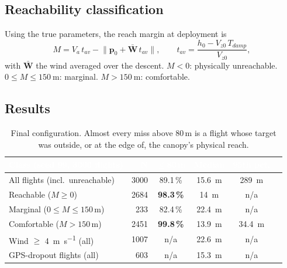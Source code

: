 \documentclass[11pt,a4paper]{article}
\newcommand{\good}[1]{\textcolor{goodgreen}{\textbf{#1}}}
\newcommand{\hdr}[1]{\textcolor{white}{\textbf{#1}}}
\newcommand{\vect}[1]{\mathbf{#1}}
\begin{document}
\subsection{Reachability classification}
Using the true parameters, the reach margin at deployment is
\begin{equation}
  M = V_a\, t_{av} - \bigl\lVert \vect p_0 + \bar{\vect W}\, t_{av} \bigr\rVert,
  \qquad t_{av} = \frac{h_0 - V_{z0}\,T_{damp}}{V_{z0}},
\end{equation}
with $\bar{\vect W}$ the wind averaged over the descent. $M < 0$: physically
unreachable. $0 \le M \le \SI{150}{\meter}$: marginal. $M > \SI{150}{\meter}$:
comfortable.

\subsection{Results}
\begin{table}[H]
\centering
\small
\renewcommand{\arraystretch}{1.2}
\begin{tabular}{lrcccc}
\toprule
\rowcolor{tblhead}\hdr{Class (seed 99, 3000 flights)} & \hdr{N} & \hdr{$\le$80\,m} & \hdr{Median} & \hdr{95th pct.} \\
\midrule
All flights (incl.\ unreachable) & 3000 & 89.1\,\% & \SI{15.6}{\meter} & \SI{289}{\meter} \\
Reachable ($M \ge 0$) & 2684 & \good{98.3\,\%} & \SI{14}{\meter} & n/a \\
\quad Marginal ($0 \le M \le 150$\,m) & 233 & 82.4\,\% & \SI{22.4}{\meter} & n/a \\
\quad Comfortable ($M > 150$\,m) & 2451 & \good{99.8\,\%} & \SI{13.9}{\meter} & \SI{34.4}{\meter} \\
Wind $\ge$ \SI{4}{\meter\per\second} (all) & 1007 & n/a & \SI{22.6}{\meter} & n/a \\
GPS-dropout flights (all) & 603 & n/a & \SI{15.3}{\meter} & n/a \\
\bottomrule
\end{tabular}
\caption{Final configuration. Almost every miss above 80\,m is a flight
whose target was outside, or at the edge of, the canopy's physical reach.}
\end{table}
\end{document}
